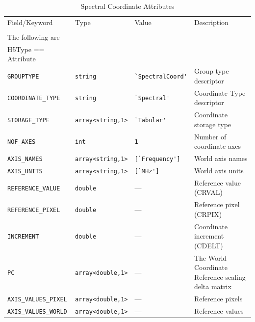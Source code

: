 \documentclass[a4paper,10pt,bibtotoc]{scrartcl}
\begin{document}
\begin{table}[hp]
\begin{small}
\begin{center}
  \begin{tabular}{|lllp{4.5cm}|}
    \hline
    \sc Field/Keyword  & \sc Type & \sc Value & Description \\
    \sc   & \sc & \sc & \\
    \hline \hline
    \sc The following are & \sc & \sc & \\
    \sc H5Type == Attribute & \sc & \sc & \\
    \hline 
    \verb|GROUPTYPE|   & \verb|string| & \verb|`SpectralCoord'| & Group type descriptor \\
    \verb|COORDINATE_TYPE| & \verb|string| & \verb|`Spectral'| & Coordinate Type  descriptor \\
    \verb|STORAGE_TYPE| & \verb|array<string,1>| & \verb|`Tabular'| & Coordinate storage type \\
    \verb|NOF_AXES|    & \verb|int| & \verb|1| & Number of coordinate axes \\
    \verb|AXIS_NAMES|  & \verb|array<string,1>| & \verb|[`Frequency']| & World axis names \\
    \verb|AXIS_UNITS|  & \verb|array<string,1>| & \verb|[`MHz']| & World axis units \\
    \verb|REFERENCE_VALUE|  & \verb|double| & --- & Reference value (CRVAL) \\
    \verb|REFERENCE_PIXEL|  & \verb|double| & --- & Reference pixel (CRPIX) \\
    \verb|INCREMENT|  & \verb|double| & --- & Coordinate increment (CDELT) \\
    \verb|PC|     & \verb|array<double,1>| & --- & The World Coordinate Reference scaling delta matrix \\
    \verb|AXIS_VALUES_PIXEL|  & \verb|array<double,1>| & --- & Reference pixels \\
    \verb|AXIS_VALUES_WORLD|  & \verb|array<double,1>| & --- & Reference values \\
 \hline
\end{tabular}
\end{center}
\end{small}
\caption{Spectral Coordinate Attributes}
\label{tab:spectral coordinate}
\end{table}

\clearpage
\end{document}
